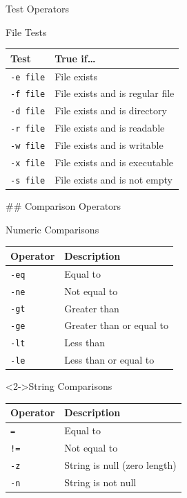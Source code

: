 \documentclass[presentation,aspectratio=1610]{beamer}
\begin{document}
\begin{frame}[label={sec:orgb47ae4e},fragile]{Test Operators}
 \begin{block}{File Tests}
\begin{center}
\begin{tabular}{ll}
Test & True if\ldots{}\\
\hline
\texttt{-e file} & File exists\\
\texttt{-f file} & File exists and is regular file\\
\texttt{-d file} & File exists and is directory\\
\texttt{-r file} & File exists and is readable\\
\texttt{-w file} & File exists and is writable\\
\texttt{-x file} & File exists and is executable\\
\texttt{-s file} & File exists and is not empty\\
\end{tabular}
\end{center}

\#\# Comparison Operators
\end{block}
\begin{block}{Numeric Comparisons}
\begin{center}
\begin{tabular}{ll}
Operator & Description\\
\hline
\texttt{-eq} & Equal to\\
\texttt{-ne} & Not equal to\\
\texttt{-gt} & Greater than\\
\texttt{-ge} & Greater than or equal to\\
\texttt{-lt} & Less than\\
\texttt{-le} & Less than or equal to\\
\end{tabular}
\end{center}
\end{block}
\begin{exampleblock}<2->{String Comparisons}\label{sec:org676e9c7}
\begin{center}
\begin{tabular}{ll}
Operator & Description\\
\hline
\texttt{=} & Equal to\\
\texttt{!=} & Not equal to\\
\texttt{-z} & String is null (zero length)\\
\texttt{-n} & String is not null\\
\end{tabular}
\end{center}
\end{exampleblock}
\end{frame}
\end{document}
